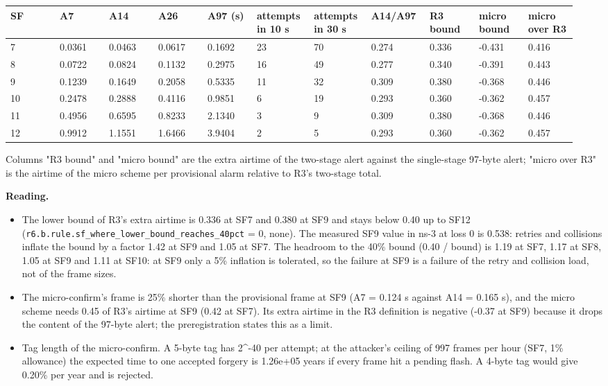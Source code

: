 {\scriptsize\raggedright
\begin{longtable}{p{0.086\linewidth}p{0.086\linewidth}p{0.086\linewidth}p{0.086\linewidth}p{0.086\linewidth}p{0.086\linewidth}p{0.086\linewidth}p{0.086\linewidth}p{0.086\linewidth}p{0.086\linewidth}p{0.086\linewidth}}
\toprule
SF & A7 & A14 & A26 & A97 (s) & attempts in 10 s & attempts in 30 s & A14/A97 & R3 bound & micro bound & micro over R3 \\
\midrule
\endhead
7 & 0.0361 & 0.0463 & 0.0617 & 0.1692 & 23 & 70 & 0.274 & 0.336 & -0.431 & 0.416 \\
8 & 0.0722 & 0.0824 & 0.1132 & 0.2975 & 16 & 49 & 0.277 & 0.340 & -0.391 & 0.443 \\
9 & 0.1239 & 0.1649 & 0.2058 & 0.5335 & 11 & 32 & 0.309 & 0.380 & -0.368 & 0.446 \\
10 & 0.2478 & 0.2888 & 0.4116 & 0.9851 & 6 & 19 & 0.293 & 0.360 & -0.362 & 0.457 \\
11 & 0.4956 & 0.6595 & 0.8233 & 2.1340 & 3 & 9 & 0.309 & 0.380 & -0.368 & 0.446 \\
12 & 0.9912 & 1.1551 & 1.6466 & 3.9404 & 2 & 5 & 0.293 & 0.360 & -0.362 & 0.457 \\
\bottomrule
\end{longtable}}

Columns "R3 bound" and "micro bound" are the extra airtime of the two-stage alert against the single-stage 97-byte alert; "micro over R3" is the airtime of the micro scheme per provisional alarm relative to R3's two-stage total.

\textbf{Reading.}
\begin{itemize}
\item The lower bound of R3's extra airtime is 0.336 at SF7 and 0.380 at SF9 and stays below 0.40 up to SF12 (\texttt{r6.b.rule.sf\_where\_lower\_bound\_reaches\_40pct} = 0, none). The measured SF9 value in ns-3 at loss 0 is 0.538: retries and collisions inflate the bound by a factor 1.42 at SF9 and 1.05 at SF7. The headroom to the 40\% bound (0.40 / bound) is 1.19 at SF7, 1.17 at SF8, 1.05 at SF9 and 1.11 at SF10: at SF9 only a 5\% inflation is tolerated, so the failure at SF9 is a failure of the retry and collision load, not of the frame sizes.
\item The micro-confirm's frame is 25\% shorter than the provisional frame at SF9 (A7 = 0.124 s against A14 = 0.165 s), and the micro scheme needs 0.45 of R3's airtime at SF9 (0.42 at SF7). Its extra airtime in the R3 definition is negative (-0.37 at SF9) because it drops the content of the 97-byte alert; the preregistration states this as a limit.
\item Tag length of the micro-confirm. A 5-byte tag has 2\textasciicircum{}-40 per attempt; at the attacker's ceiling of 997 frames per hour (SF7, 1\% allowance) the expected time to one accepted forgery is 1.26e+05 years if every frame hit a pending flash. A 4-byte tag would give 0.20\% per year and is rejected.
\end{itemize}

